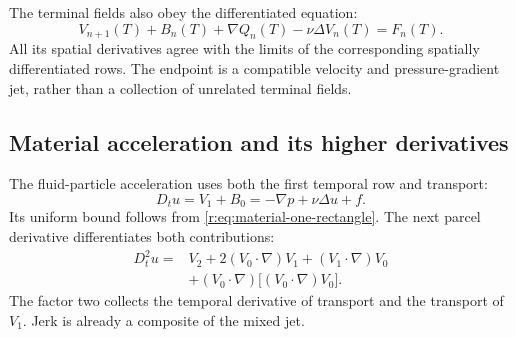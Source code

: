 The terminal fields also obey the differentiated equation:
\[
 V_{n+1}(T)+B_n(T)+\nabla Q_n(T)-\nu\Delta V_n(T)=F_n(T).
\]
All its spatial derivatives agree with the limits of the corresponding
spatially differentiated rows. The endpoint is a compatible velocity and
pressure-gradient jet, rather than a collection of unrelated terminal fields.



\subsection{Material acceleration and its higher derivatives}

The fluid-particle acceleration uses both the first temporal row and
transport:
\begin{equation}
 D_tu=V_1+B_0=-\nabla p+\nu\Delta u+f.
\label{r:eq:material}
\end{equation}
Its uniform bound follows from \eqref{r:eq:material-one-rectangle}.
The next parcel derivative differentiates both contributions:
\begin{equation}
 \begin{aligned}
 D_t^2u={}&V_2+2(V_0\cdot\nabla)V_1+(V_1\cdot\nabla)V_0\\
 &+(V_0\cdot\nabla)\bigl[(V_0\cdot\nabla)V_0\bigr].
 \end{aligned}
 \label{r:eq:jerk-mixed-jet}
\end{equation}
The factor two collects the temporal derivative of transport and the
transport of \(V_1\). Jerk is already a composite of the mixed jet.


